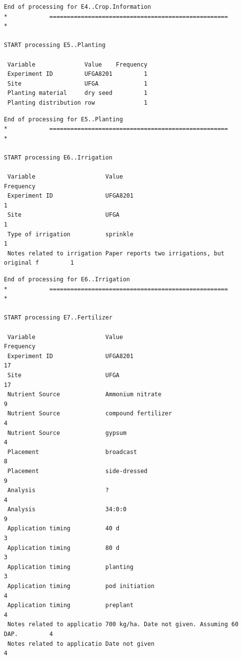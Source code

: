 \documentclass[
]{article}
\begin{document}
\begin{verbatim}
End of processing for E4..Crop.Information
*            ===================================================            *

START processing E5..Planting

 Variable              Value    Frequency
 Experiment ID         UFGA8201         1
 Site                  UFGA             1
 Planting material     dry seed         1
 Planting distribution row              1
\end{verbatim}

\begin{verbatim}
End of processing for E5..Planting
*            ===================================================            *

START processing E6..Irrigation

 Variable                    Value                                         Frequency
 Experiment ID               UFGA8201                                              1
 Site                        UFGA                                                  1
 Type of irrigation          sprinkle                                              1
 Notes related to irrigation Paper reports two irrigations, but original f         1
\end{verbatim}

\begin{verbatim}
End of processing for E6..Irrigation
*            ===================================================            *

START processing E7..Fertilizer

 Variable                    Value                                       Frequency
 Experiment ID               UFGA8201                                           17
 Site                        UFGA                                               17
 Nutrient Source             Ammonium nitrate                                    9
 Nutrient Source             compound fertilizer                                 4
 Nutrient Source             gypsum                                              4
 Placement                   broadcast                                           8
 Placement                   side-dressed                                        9
 Analysis                    ?                                                   4
 Analysis                    34:0:0                                              9
 Application timing          40 d                                                3
 Application timing          80 d                                                3
 Application timing          planting                                            3
 Application timing          pod initiation                                      4
 Application timing          preplant                                            4
 Notes related to applicatio 700 kg/ha. Date not given. Assuming 60 DAP.         4
 Notes related to applicatio Date not given                                      4
\end{verbatim}
\end{document}
